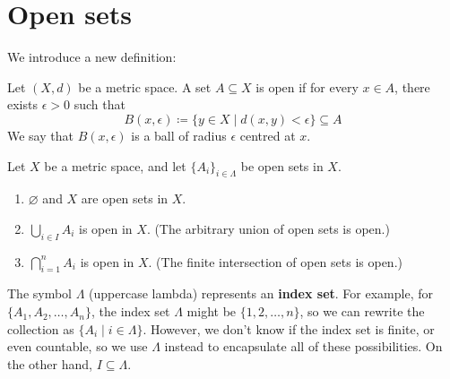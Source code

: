 \section{Open sets}
We introduce a new definition:
\begin{definition}
  Let $(X, d)$ be a metric space. A set $A \subseteq X$ is open if for every $x \in A$, there exists $\epsilon > 0$ such that
  \[
    B(x, \epsilon) \coloneqq \{ y \in X \; | \; d(x, y) < \epsilon \} \subseteq A
  \]
  We say that $B(x, \epsilon)$ is a ball of radius $\epsilon$ centred at $x$.
\end{definition}
\begin{theorem}
  \label{thm:topological-prop-open-sets}
  Let $X$ be a metric space, and let $\{A_i\}_{i \in \Lambda}$ be open sets in $X$.
  \begin{enumerate}
    \item $\varnothing$ and $X$ are open sets in $X$.
    \item $\bigcup_{i \in I} A_i$ is open in $X$. (The arbitrary union of open sets is open.)
    \item $\bigcap_{i = 1}^{n} A_i$ is open in $X$. (The finite intersection of open sets is open.)
  \end{enumerate}
\end{theorem}
\begin{remark}
  The symbol $\Lambda$ (uppercase lambda) represents an \textbf{index set}. For example, for $\{A_1, A_2, \ldots, A_n\}$, the index set $\Lambda$ might be $\{1, 2, \ldots, n\}$, so we can rewrite the collection as $\{A_i \; | \; i \in \Lambda\}$. However, we don't know if the index set is finite, or even countable, so we use $\Lambda$ instead to encapsulate all of these possibilities. On the other hand, $I \subseteq \Lambda$.
\end{remark}
